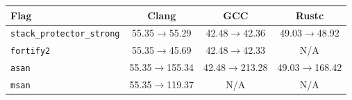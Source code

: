 \begin{tabular*}{\columnwidth}{@{\extracolsep\fill}lccc@{\extracolsep\fill}}
\toprule
\textbf{Flag} & \textbf{Clang} & \textbf{GCC} & \textbf{Rustc} \\
\midrule
\texttt{stack\_protector\_strong} & 55.35$\to$55.29 & 42.48$\to$42.36 & 49.03$\to$48.92 \\
\texttt{fortify2} & 55.35$\to$45.69 & 42.48$\to$42.33 & N/A \\
\texttt{asan} & 55.35$\to$155.34 & 42.48$\to$213.28 & 49.03$\to$168.42 \\
\texttt{msan} & 55.35$\to$119.37 & N/A & N/A \\
\bottomrule
\end{tabular*}
